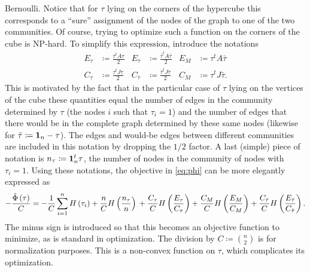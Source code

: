 \documentclass[../../main.tex]{subfiles} %
\begin{document}
Bernoulli. Notice that for \(\tau\) lying on the corners of the hypercube this 
corresponds to a ``sure'' assignment of the nodes of the graph to one of the 
two communities. Of course, trying to optimize such a function on the corners 
of the cube is NP-hard. To simplify this expression, introduce the notations
	\begin{align} \label{eq:combinatorial-notation}
		E_\tau &\coloneqq \frac{\tau^t A \tau}{2} & E_{\bar\tau} &\coloneqq 
		\frac{\bar\tau^t A \bar\tau}{2} & E_M &\coloneqq \tau^t A \bar\tau \\
		C_\tau &\coloneqq \frac{\tau^t J \tau}{2} & C_{\bar\tau} &\coloneqq 
		\frac{\bar\tau^t J \bar\tau}{2} & C_M &\coloneqq \tau^t J \bar\tau.
	\end{align}
This is motivated by the fact that in the particular case of \(\tau\) lying on 
the vertices of the cube these quantities equal the number of edges in the 
community determined by \(\tau\) (the nodes \(i\) such that \(\tau_i = 1\)) and 
the number of edges that there would be in the complete graph determined by 
these same nodes (likewise for \(\bar\tau \coloneqq \mathbf{1}_{n} - \tau\)). The edges 
and would-be edges between different communities are included in this notation 
by dropping the \(1/2\) factor. A last (simple) piece of notation is \(n_\tau 
\coloneqq \mathbf{1}_{n}^t \tau\), the number of nodes in the community of nodes with 
\(\tau_i = 1\). Using these notations, the objective in \ref{eq:phi} can be 
more elegantly expressed as
\begin{dmath}
	-\frac{\hat \Phi \left( \tau \right)}{C} =
	-\frac{1}{C}\sum_{i=1}^n H \left( \tau_i \right) 
	+ \frac{n}{C} H \left( \frac{n_\tau}{n} \right) \\
	+ \frac{C_\tau}{C} H \left( \frac{E_\tau}{C_\tau}
	\right) 
	+ \frac{C_M}{C} H \left( \frac{E_M}{C_M} \right)
	+ \frac{C_{\bar \tau}}{C} H \left( \frac{E_{\bar\tau}}{C_{\bar\tau}}\right).
	\label{eq:phinotation}
\end{dmath}
The minus sign is introduced so that this becomes an objective function to 
minimize, as is standard in optimization. The division by 
\(C\coloneqq\binom{n}{2}\) is for normalization purposes. This is a non-convex 
function on \(\tau\), which complicates its optimization.
\end{document}
